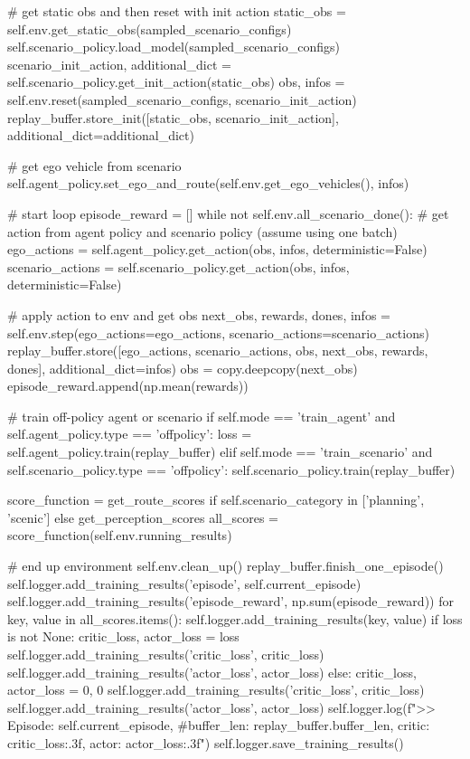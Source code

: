 \begin{appendix}
\# get static obs and then reset with init action 
static\_obs = self.env.get\_static\_obs(sampled\_scenario\_configs)
self.scenario\_policy.load\_model(sampled\_scenario\_configs)
scenario\_init\_action, additional\_dict = self.scenario\_policy.get\_init\_action(static\_obs)
obs, infos = self.env.reset(sampled\_scenario\_configs, scenario\_init\_action)
replay\_buffer.store\_init([static\_obs, scenario\_init\_action], additional\_dict=additional\_dict)

\# get ego vehicle from scenario
self.agent\_policy.set\_ego\_and\_route(self.env.get\_ego\_vehicles(), infos)

\# start loop
episode\_reward = []
while not self.env.all\_scenario\_done():
\# get action from agent policy and scenario policy (assume using one batch)
ego\_actions = self.agent\_policy.get\_action(obs, infos, deterministic=False)
scenario\_actions = self.scenario\_policy.get\_action(obs, infos, deterministic=False)

\# apply action to env and get obs
next\_obs, rewards, dones, infos = self.env.step(ego\_actions=ego\_actions, scenario\_actions=scenario\_actions)
replay\_buffer.store([ego\_actions, scenario\_actions, obs, next\_obs, rewards, dones], additional\_dict=infos)
obs = copy.deepcopy(next\_obs)
episode\_reward.append(np.mean(rewards))

\# train off-policy agent or scenario
if self.mode == 'train\_agent' and self.agent\_policy.type == 'offpolicy':
loss = self.agent\_policy.train(replay\_buffer)
elif self.mode == 'train\_scenario' and self.scenario\_policy.type == 'offpolicy':
self.scenario\_policy.train(replay\_buffer)

score\_function = get\_route\_scores if self.scenario\_category in ['planning', 'scenic'] else get\_perception\_scores
all\_scores = score\_function(self.env.running\_results)

\# end up environment
self.env.clean\_up()
replay\_buffer.finish\_one\_episode()
self.logger.add\_training\_results('episode', self.current\_episode)
self.logger.add\_training\_results('episode\_reward', np.sum(episode\_reward))
for key, value in all\_scores.items():
self.logger.add\_training\_results(key, value)
if loss is not None:
critic\_loss, actor\_loss = loss
self.logger.add\_training\_results('critic\_loss', critic\_loss)
self.logger.add\_training\_results('actor\_loss', actor\_loss)
else:
critic\_loss, actor\_loss = 0, 0
self.logger.add\_training\_results('critic\_loss', critic\_loss)
self.logger.add\_training\_results('actor\_loss', actor\_loss)  
self.logger.log(f">> Episode: {self.current\_episode}, \#buffer\_len: {replay\_buffer.buffer\_len}, critic: {critic\_loss:.3f}, actor: {actor\_loss:.3f}")
self.logger.save\_training\_results()


\end{appendix}
